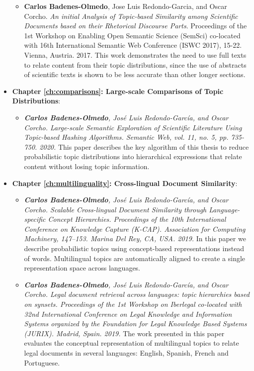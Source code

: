 \begin{itemize}
\begin{itemize}
\item \textbf{Carlos Badenes-Olmedo}, Jose Luis Redondo-Garcia, and Oscar Corcho. \textit{An initial Analysis of Topic-based Similarity among Scientific Documents based on their Rhetorical Discourse Parts}. Proceedings of the 1st Workshop on Enabling Open Semantic Science (SemSci) co-located with 16th International Semantic Web Conference (ISWC 2017), 15-22. Vienna, Austria. 2017. This work demonstrates the need to use full texts to relate content from their topic distributions, since the use of abstracts of scientific texts is shown to be less accurate than other longer sections. 
\end{itemize}
\item \textbf{Chapter \ref{ch:comparisons}: Large-scale Comparisons of Topic Distributions}:
\begin{itemize}
\item \textit{\textbf{Carlos Badenes-Olmedo}, José Luis Redondo-García, and Oscar Corcho. \textit{Large-scale Semantic Exploration of Scientific Literature Using Topic-based Hashing Algorithms}. Semantic Web, vol. 11, no. 5, pp. 735-750. 2020.} This paper describes the key algorithm of this thesis to reduce probabilistic topic distributions into hierarchical expressions that relate content without losing topic information.
\end{itemize}
\item \textbf{Chapter \ref{ch:multilinguality}: Cross-lingual Document Similarity}:
\begin{itemize}
\item \textit{\textbf{Carlos Badenes-Olmedo}, José Luis Redondo-García, and Oscar Corcho. \textit{Scalable Cross-lingual Document Similarity through Language-specific Concept Hierarchies}. Proceedings of the 10th International Conference on Knowledge Capture (K-CAP). Association for Computing Machinery, 147–153. Marina Del Rey, CA, USA. 2019.} In this paper we describe probabilistic topics using concept-based representations instead of words.  Multilingual topics are automatically aligned to create a single representation space across languages.   
\item \textit{\textbf{Carlos Badenes-Olmedo}, José Luis Redondo-García, and Oscar Corcho. \textit{Legal document retrieval across languages: topic hierarchies based on synsets}. Proceedings of the 1st Workshop on Iberlegal co-located with 32nd International Conference on Legal Knowledge and Information Systems organized by the Foundation for Legal Knowledge Based Systems (JURIX). Madrid, Spain. 2019.} The work presented in this paper evaluates the conceptual representation of multilingual topics to relate legal documents in several languages: English, Spanish, French and Portuguese.

\end{itemize}
\end{itemize}
